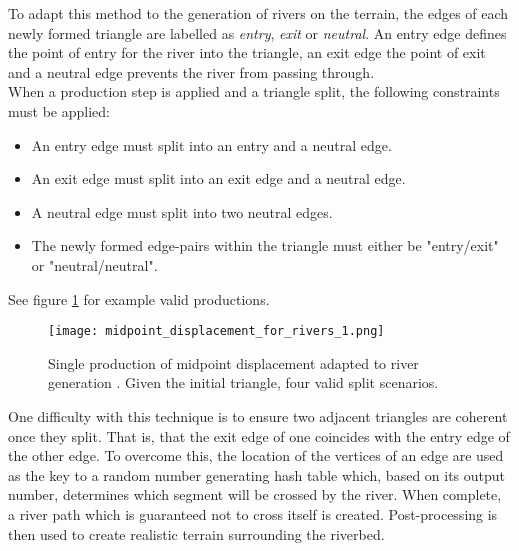 To adapt this method to the generation of rivers on the terrain, the edges of each newly formed triangle are labelled as \textit{entry}, \textit{exit} or \textit{neutral}. An entry edge defines the point of entry for the river into the triangle, an exit edge the point of exit and a neutral edge prevents the river from passing through.\\

When a production step is applied and a triangle split, the following constraints must be applied:
\begin{itemize}
\item An entry edge must split into an entry and a neutral edge.
\item An exit edge must split into an exit edge and a neutral edge.
\item A neutral edge must split into two neutral edges.
\item The newly formed edge-pairs within the triangle must either be "entry/exit" or "neutral/neutral".
\end{itemize}

See figure \ref{Single production of midpoint displacement adapted to river generation. Given the initial triangle, four valid split scenarios. } for example valid productions.

\begin{figure}[h]
  \centering
	\label{Single production of midpoint displacement adapted to river generation. Given the initial triangle, four valid split scenarios. }
	\texttt{[image: midpoint\_displacement\_for\_rivers\_1.png]}
	\caption{Single production of midpoint displacement adapted to river generation \cite{Prusinkiewicz1993}. Given the initial triangle, four valid split scenarios.}
\end{figure}

One difficulty with this technique is to ensure two adjacent triangles are coherent once they split. That is, that the exit edge of one coincides with the entry edge of the other edge. To overcome this, the location of the vertices of an edge are used as the key to a random number generating hash table which, based on its output number, determines which segment will be crossed by the river. When complete, a river path which is guaranteed not to cross itself is created. Post-processing is then used to create realistic terrain surrounding the riverbed.\\

